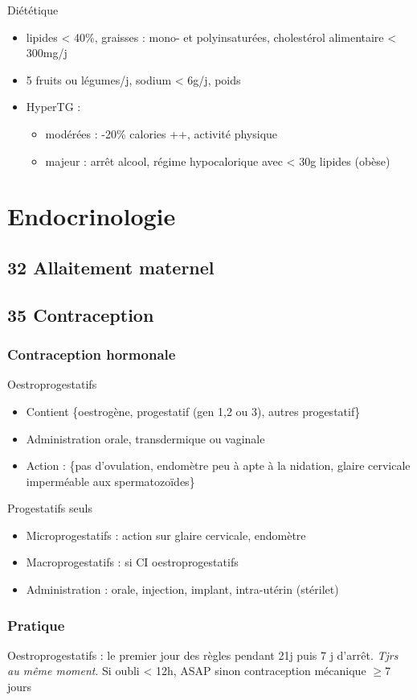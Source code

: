 \documentclass{book}
\begin{document}
Diététique
\begin{itemize}
\item lipides < 40\%, graisses : mono- et polyinsaturées, cholestérol alimentaire < 300mg/j
\item 5 fruits ou légumes/j, sodium < 6g/j, \dec poids
\item HyperTG : 
\begin{itemize}
\item modérées : -20\% calories ++, \inc activité physique
\item majeur : arrêt alcool, régime hypocalorique avec < 30g lipides (obèse)
\end{itemize}
\end{itemize}

\chapter{Endocrinologie}
\label{sec:org19a668b}
\section{32 \textdagger{} Allaitement maternel}
\label{sec:org02e0b76}
\section{35 \textdagger{} Contraception}
\label{sec:org45c925e}
\subsection{Contraception hormonale}
\label{sec:org65ec7f8}
Oestroprogestatifs
\begin{itemize}
\item Contient \{oestrogène, progestatif (gen 1,2 ou 3), autres progestatif\}
\item Administration orale, transdermique ou vaginale
\item Action : \{pas d'ovulation, endomètre peu à apte à la nidation, glaire
cervicale imperméable aux spermatozoïdes\}
\end{itemize}
Progestatifs seuls 
\begin{itemize}
\item Microprogestatifs : action sur glaire cervicale, endomètre
\item Macroprogestatifs : si CI oestroprogestatifs
\item Administration : orale, injection, implant, intra-utérin (stérilet)
\end{itemize}
\subsection{Pratique}
\label{sec:org2c6f297}
Oestroprogestatifs : le premier jour des règles pendant 21j puis 7 j
d'arrêt. \emph{Tjrs au même moment}. Si oubli < 12h, ASAP sinon contraception mécanique \(\ge 7\) jours
\end{document}
